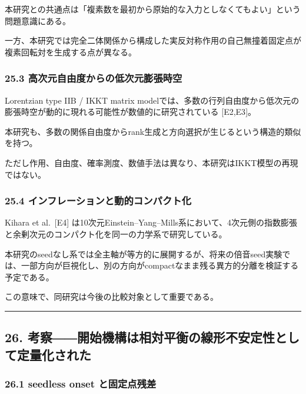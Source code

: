 \documentclass[
  a4paper,
]{ltjsarticle}
\begin{document}
本研究との共通点は「複素数を最初から原始的な入力としなくてもよい」という問題意識にある。

一方、本研究では完全二体関係から構成した実反対称作用の自己無撞着固定点が複素回転対を生成する点が異なる。

\subsubsection{25.3
高次元自由度からの低次元膨張時空}\label{ux9ad8ux6b21ux5143ux81eaux7531ux5ea6ux304bux3089ux306eux4f4eux6b21ux5143ux81a8ux5f35ux6642ux7a7a}

Lorentzian type IIB / IKKT matrix
modelでは、多数の行列自由度から低次元の膨張時空が動的に現れる可能性が数値的に研究されている
{[}E2,E3{]}。

本研究も、多数の関係自由度からrank生成と方向選択が生じるという構造的類似を持つ。

ただし作用、自由度、確率測度、数値手法は異なり、本研究はIKKT模型の再現ではない。

\subsubsection{25.4
インフレーションと動的コンパクト化}\label{ux30a4ux30f3ux30d5ux30ecux30fcux30b7ux30e7ux30f3ux3068ux52d5ux7684ux30b3ux30f3ux30d1ux30afux30c8ux5316}

Kihara et al.~{[}E4{]}
は10次元Einstein--Yang--Mills系において、4次元側の指数膨張と余剰次元のコンパクト化を同一の力学系で研究している。

本研究のseedなし系では全主軸が等方的に展開するが、将来の倍音seed実験では、一部方向が巨視化し、別の方向がcompactなまま残る異方的分離を検証する予定である。

この意味で、同研究は今後の比較対象として重要である。

\begin{center}\rule{0.5\linewidth}{0.5pt}\end{center}

\subsection{26.
考察――開始機構は相対平衡の線形不安定性として定量化された}\label{ux8003ux5bdfux958bux59cbux6a5fux69cbux306fux76f8ux5bfeux5e73ux8861ux306eux7ddaux5f62ux4e0dux5b89ux5b9aux6027ux3068ux3057ux3066ux5b9aux91cfux5316ux3055ux308cux305f}

\subsubsection{26.1 seedless onset
と固定点残差}\label{seedless-onset-ux3068ux56faux5b9aux70b9ux6b8bux5dee}
\end{document}
